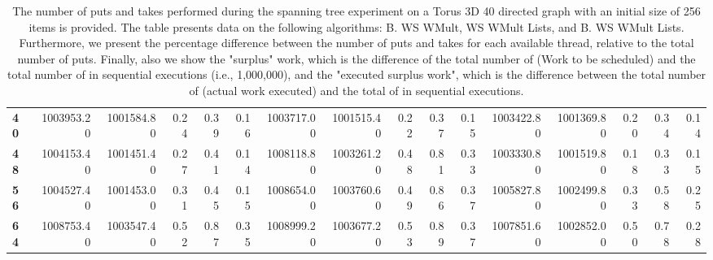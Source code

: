 \begin{table}[!ht]
{\begin{tabular}{lrrrrrrrrrrrrrrr}
\textbf{40} &  1003953.20 & 1001584.80 &           0.24 &        0.39 &                 0.16 &     1003717.00 & 1001515.40 &           0.22 &        0.37 &                 0.15 &        1003422.80 & 1001369.80 &           0.20 &        0.34 &                 0.14 \\
\textbf{48} &  1004153.40 & 1001451.40 &           0.27 &        0.41 &                 0.14 &     1008118.80 & 1003261.20 &           0.48 &        0.81 &                 0.33 &        1003330.80 & 1001519.80 &           0.18 &        0.33 &                 0.15 \\
\textbf{56} &  1004527.40 & 1001453.00 &           0.31 &        0.45 &                 0.15 &     1008654.00 & 1003760.60 &           0.49 &        0.86 &                 0.37 &        1005827.80 & 1002499.80 &           0.33 &        0.58 &                 0.25 \\
\textbf{64} &  1008753.40 & 1003547.40 &           0.52 &        0.87 &                 0.35 &     1008999.20 & 1003677.20 &           0.53 &        0.89 &                 0.37 &        1007851.60 & 1002852.00 &           0.50 &        0.78 &                 0.28 \\
\bottomrule
\end{tabular}}
\label{difference-Torus_3D_40_directed-256-B_WS_NC_MULT_OPT-WS_NC_MULT_LA_OPT-B_WS_NC_MULT_LA_OPT}
\caption{The number of puts and takes performed during the
    spanning tree experiment on a Torus 3D 40 directed graph with an initial size
    of 256 items is provided. The table presents data on the
    following algorithms: B. WS WMult, WS WMult Lists, and
    B. WS WMult Lists. Furthermore, we present the percentage difference
    between the number of puts and takes for each available thread,
    relative to the total number of puts. Finally, also we show the
    "surplus" work, which is the difference of the total number of
    \Puts (Work to be scheduled) and the total number of \Puts in
    sequential executions (i.e., 1,000,000), and the "executed surplus
    work", which is the difference between the total number of \Takes
    (actual work executed) and the total of \Takes in sequential
    executions.}
\end{table}
